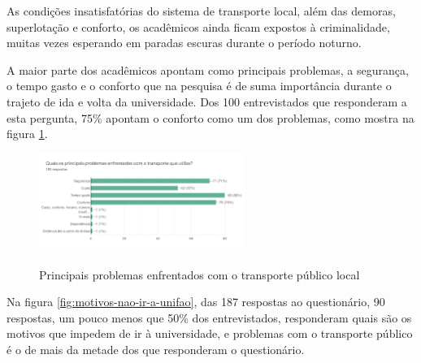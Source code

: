 As condições insatisfatórias do sistema de transporte local, além das demoras, superlotação e conforto, os acadêmicos ainda ficam expostos à criminalidade, muitas vezes esperando em paradas escuras durante o período noturno.

A maior parte dos acadêmicos apontam como principais problemas, a segurança, o tempo gasto e o conforto que na pesquisa é de suma importância durante o trajeto de ida e volta da universidade. Dos 100 entrevistados que responderam a esta pergunta, 75\% apontam o conforto como um dos problemas, como mostra na figura \ref{fig:problemasenfrentadosparair}.

\begin{figure}[!hbtp]
	\centering
	\caption{Principais problemas enfrentados com o transporte público local}
	\includegraphics[width=0.6\textwidth]{./04-figuras/questionario/11.png}
	\label{fig:problemasenfrentadosparair}
\end{figure}


Na figura \ref{fig:motivos-nao-ir-a-unifao}, das 187 respostas ao questionário, 90 respostas, um pouco menos que 50\% dos entrevistados, responderam quais são os motivos que impedem de ir à universidade, e problemas com o transporte público é o de mais da metade dos que responderam o questionário.

